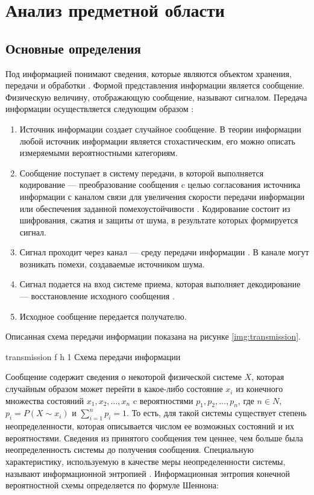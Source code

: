 \chapter{Анализ предметной области}

\section{Основные определения}

Под информацией понимают сведения, которые являются объектом хранения, передачи и обработки \cite{information}. Формой представления информации является сообщение. Физическую величину, отображающую сообщение, называют сигналом. Передача информации осуществляется следующим образом \cite{transmission}:

\begin{enumerate}
	\item Источник информации создает случайное сообщение. В теории информации любой источник информации является стохастическим, его можно описать измеряемыми вероятностными категориям.
	\item Сообщение поступает в систему передачи, в которой выполняется кодирование --- преобразование сообщения c целью согласования источника информации с каналом связи для увеличения скорости передачи информации или обеспечения заданной помехоустойчивости  \cite{information}. Кодирование состоит из шифрования, сжатия и защиты от шума, в результате которых формируется сигнал. 
	\item Сигнал проходит через канал --- среду передачи информации \cite{transmission}. В канале могут возникать помехи, создаваемые источником шума.
	\item Сигнал подается на вход системе приема, которая выполняет декодирование --- восстановление исходного сообщения \cite{information}.
	\item Исходное сообщение передается получателю.
\end{enumerate}

Описанная схема передачи информации показана на рисунке \ref{img:transmission}.

    {transmission}
    {f}
    {h}
    {1\textwidth}
    {Схема передачи информации}
    
Сообщение содержит сведения о некоторой физической системе $X$, которая случайным образом может перейти в какое-либо состояние $x_{i}$ из конечного множества состояний $x_{1}, x_{2}, \dots, x_{n}$ c вероятностями $p_{1}, p_{2}, \dots, p_{n}$, где $n \in N$, $p_{i} = P(X \sim x_{i})$ и $\sum_{i = 1}^n p_{i} = 1$. То есть, для такой системы существует степень неопределенности, которая описывается числом ее возможных состояний и их вероятностями. Сведения из принятого сообщения тем ценнее, чем больше была неопределенность системы до получения сообщения. Специальную характеристику, используемую в качестве меры неопределенности системы, называют информационной энтропией \cite{definition}. Информационная энтропия конечной вероятностной схемы определяется по формуле Шеннона:

